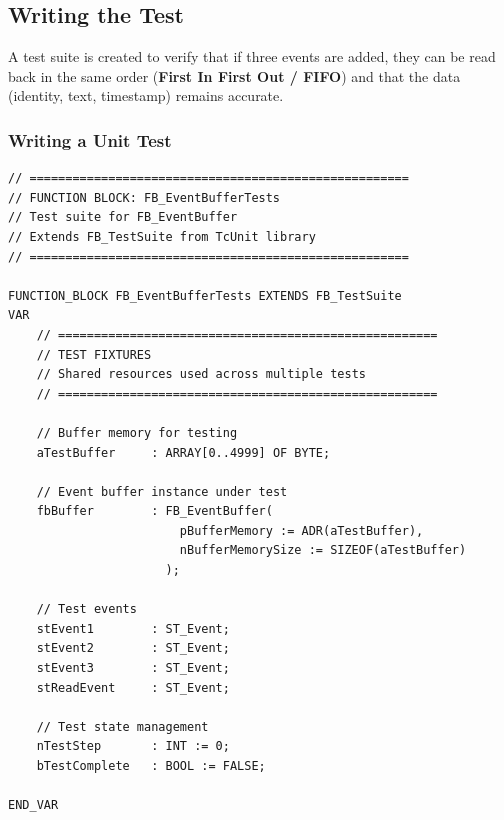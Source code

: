 \documentclass[11pt,a4paper]{article}
\begin{document}
\subsection{Writing the Test}

A test suite is created to verify that if three events are added, they can be read back in the same order (\textbf{First In First Out / FIFO}) and that the data (identity, text, timestamp) remains accurate.

\subsubsection*{Writing a Unit Test}

\begin{lstlisting}
// =====================================================
// FUNCTION BLOCK: FB_EventBufferTests
// Test suite for FB_EventBuffer
// Extends FB_TestSuite from TcUnit library
// =====================================================

FUNCTION_BLOCK FB_EventBufferTests EXTENDS FB_TestSuite
VAR
    // =====================================================
    // TEST FIXTURES
    // Shared resources used across multiple tests
    // =====================================================
    
    // Buffer memory for testing
    aTestBuffer     : ARRAY[0..4999] OF BYTE;
    
    // Event buffer instance under test
    fbBuffer        : FB_EventBuffer(
                        pBufferMemory := ADR(aTestBuffer),
                        nBufferMemorySize := SIZEOF(aTestBuffer)
                      );
    
    // Test events
    stEvent1        : ST_Event;
    stEvent2        : ST_Event;
    stEvent3        : ST_Event;
    stReadEvent     : ST_Event;
    
    // Test state management
    nTestStep       : INT := 0;
    bTestComplete   : BOOL := FALSE;
    
END_VAR
\end{lstlisting}
\end{document}
